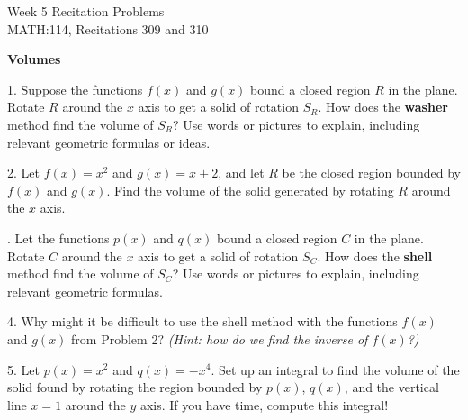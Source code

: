 \documentclass[11pt]{article}
\begin{document}
	{
		\centering
		\huge{Week 5 Recitation Problems} \\
		\Large{MATH:114, Recitations 309 and 310} \\
	}
	\vspace{3em}
	
	{
		\centering
		\large{\textbf{Volumes}} \\
	}
	
	\vspace{3em}
	
	1. Suppose the functions $f(x)$ and $g(x)$ bound a closed region $R$ in the plane. Rotate $R$ around the $x$ axis to get a solid of rotation $S_R$. How does the \textbf{washer} method find the volume of $S_R$? Use words or pictures to explain, including relevant geometric formulas or ideas.
		
	\vspace{0.35\textheight}
	2. Let $f(x) = x^2$ and $g(x)=x+2$, and let $R$ be the closed region bounded by $f(x)$ and $g(x)$. Find the volume of the solid generated by rotating $R$ around the $x$ axis.
	
	. Let the functions $p(x)$ and $q(x)$ bound a closed region $C$ in the plane. Rotate $C$ around the $x$ axis to get a solid of rotation $S_C$. How does the \textbf{shell} method find the volume of $S_C$? Use words or pictures to explain, including relevant geometric formulas.
	
	\vspace{0.3\textheight}
	4. Why might it be difficult to use the shell method with the functions $f(x)$ and $g(x)$ from Problem 2? \textit{(Hint: how do we find the inverse of $f(x)$?)}
	
	\vspace{0.2\textheight}
	5. Let $p(x)=x^2$ and $q(x)=-x^4$. Set up an integral to find the volume of the solid found by rotating the region bounded by $p(x)$, $q(x)$, and the vertical line $x=1$ around the $y$ axis. If you have time, compute this integral!
	
\end{document}
